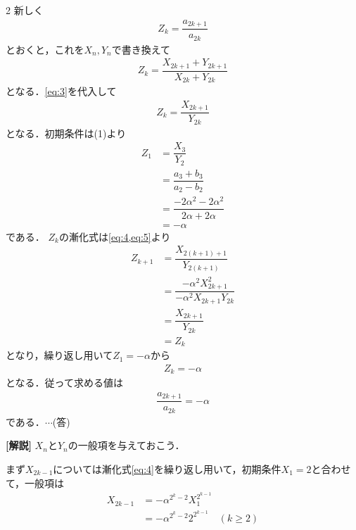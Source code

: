 \documentclass[../../main.tex]{subfiles}
\begin{document}
\begin{multicols}{2}
  新しく
  \begin{align}
    Z_{k} = \dfrac{a_{2k+1}}{a_{2k}}
  \end{align}
  とおくと，これを$X_n,Y_n$で書き換えて
  \begin{align}
    Z_{k} = \dfrac{X_{2k+1}+Y_{2k+1}}{X_{2k}+Y_{2k}}
  \end{align}
  となる．\cref{eq:3}を代入して
  \begin{align}
    Z_{k} = \dfrac{X_{2k+1}}{Y_{2k}}
  \end{align}
  となる．初期条件は(1)より
  \begin{align}
    Z_{1}
    & = \dfrac{X_{3}}{Y_{2}}                          \\
    & = \dfrac{a_{3}+b_{3}}{a_{2}-b_{2}}              \\
    & = \dfrac{-2\alpha^2-2\alpha^2}{2\alpha+2\alpha} \\
    & = -\alpha
  \end{align}
  である．
  $Z_{k}$の漸化式は\cref{eq:4,eq:5}より
  \begin{align}
    Z_{k+1}
    & = \dfrac{X_{2(k+1)+1}}{Y_{2(k+1)}}                        \\
    & = \dfrac{-\alpha^2 X^2_{2k+1}}{- \alpha^2 X_{2k+1}Y_{2k}} \\
    & = \dfrac{X_{2k+1}}{Y_{2k}}                                \\
    & = Z_{k}
  \end{align}
  となり，繰り返し用いて$Z_{1}=-\alpha$から
  \begin{align}
    Z_{k} = -\alpha
  \end{align}
  となる．従って求める値は
  \begin{align}
    \dfrac{a_{2k+1}}{a_{2k}} = -\alpha
  \end{align}
  である．$\cdots$(答)

  {\bf [解説]}
  $X_n$と$Y_n$の一般項を与えておこう．

  まず$X_{2k-1}$については漸化式\cref{eq:4}を繰り返し用いて，初期条件$X_1=2$と合わせて，一般項は
  \begin{align}
    X_{2k-1}
    & = -\alpha^{2^k-2}X_1^{2^{k-1}} \\
    & = -\alpha^{2^k-2}2^{2^{k-1}} \quad (k \ge 2)
  \end{align}

  \newpage
\end{multicols}
\end{document}
